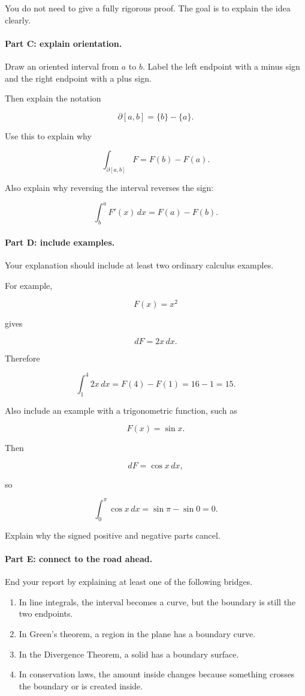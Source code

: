 You do not need to give a fully rigorous proof.  The goal is to explain the idea clearly.

\paragraph{Part C: explain orientation.}
Draw an oriented interval from \(a\) to \(b\).  Label the left endpoint with a minus sign
and the right endpoint with a plus sign.

Then explain the notation

\[
\boxed{
\partial[a,b]=\{b\}-\{a\}.
}
\]

Use this to explain why

\[
\int_{\partial[a,b]}F=F(b)-F(a).
\]

Also explain why reversing the interval reverses the sign:

\[
\int_b^a F'(x)\,dx=F(a)-F(b).
\]

\paragraph{Part D: include examples.}
Your explanation should include at least two ordinary calculus examples.

For example,

\[
F(x)=x^2
\]

gives

\[
dF=2x\,dx.
\]

Therefore

\[
\int_1^4 2x\,dx
=
F(4)-F(1)
=
16-1
=
15.
\]

Also include an example with a trigonometric function, such as

\[
F(x)=\sin x.
\]

Then

\[
dF=\cos x\,dx,
\]

so

\[
\int_0^\pi \cos x\,dx
=
\sin\pi-\sin0
=
0.
\]

Explain why the signed positive and negative parts cancel.

\paragraph{Part E: connect to the road ahead.}
End your report by explaining at least one of the following bridges.

\begin{enumerate}
\item In line integrals, the interval becomes a curve, but the boundary is still the two
endpoints.

\item In Green's theorem, a region in the plane has a boundary curve.

\item In the Divergence Theorem, a solid has a boundary surface.

\item In conservation laws, the amount inside changes because something crosses the
boundary or is created inside.
\end{enumerate}

